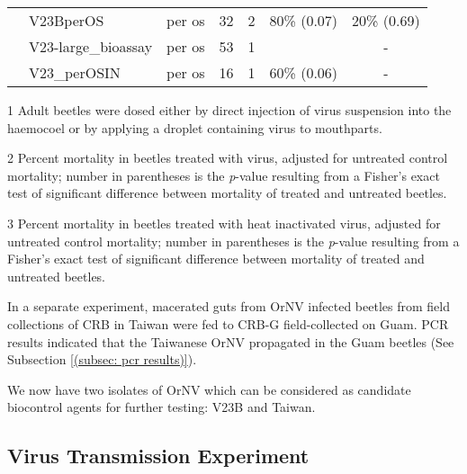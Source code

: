 \documentclass[12pt,
letterpaper,english,bibliography=totocnumbered, abstract=on]{scrartcl}
\begin{document}
\begin{table}[h]
\begin{adjustbox}{width=\columnwidth,center}
\begin{threeparttable}
\begin{tabular}{ l l l c c c c }
				& V23BperOS \parencite{moore_bioassay_2019-5}           & per os          & 32      & 2          & 80\% (0.07)                     & 20\% (0.69)                     \\
				& V23-large\_bioassay \parencite{moore_bioassay_2019-4} & per os          & 53      & 1          & \cellcolor{yellow}{42\% (0.00)} & -                               \\
				& V23\_perOSIN \parencite{moore_bioassay_2019-1}        & per os          & 16      & 1          & 60\% (0.06)                     & -                               \\ \bottomrule
			\end{tabular}
			\begin{tablenotes}[para]
				\item[1] Adult beetles were dosed either by direct injection of virus suspension into the haemocoel or by applying a droplet containing virus to mouthparts. \\ 
				\item[2] Percent mortality in beetles treated with virus, adjusted for untreated control mortality; 
				number in parentheses is the \textit{p}-value resulting from a Fisher's exact test of significant difference between mortality of treated and untreated beetles. \\
				\item[3] Percent mortality in beetles treated with heat inactivated virus, adjusted for untreated control mortality; 
				number in parentheses is the \textit{p}-value resulting from a Fisher's exact test of significant difference between mortality of treated and untreated beetles. 
			\end{tablenotes}
			
		\end{threeparttable}
	\end{adjustbox}
\end{table}

In a separate experiment, macerated guts from OrNV infected beetles from field collections of CRB in Taiwan were fed to CRB-G field-collected on Guam. PCR results indicated that the Taiwanese OrNV propagated in the Guam beetles (See Subsection \ref{(subsec: pcr results)}).

We now have two isolates of OrNV which can be considered as candidate biocontrol agents for further testing: V23B and Taiwan. 

\subsection{Virus Transmission Experiment}
\label{sec: virus transmission expt}
\end{document}
